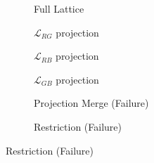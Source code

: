 \documentclass{article}
\begin{document}
\begin{figure}[hbtp]
    \centering
    \begin{subfigure}[b]{0.32\textwidth}
        \centering
        \resizebox{\linewidth}{!}{
            
        }
        \caption{Full Lattice}
    \end{subfigure}
    \hfill
    \begin{subfigure}[b]{0.32\textwidth}
        \centering
        \resizebox{\linewidth}{!}{
            
        }
        \caption{$\mathcal{L}_{RG}$ projection}
    \end{subfigure}
    \hfill
    \begin{subfigure}[b]{0.32\textwidth}
        \centering
        \resizebox{\linewidth}{!}{
            
        }
        \caption{$\mathcal{L}_{RB}$ projection}
    \end{subfigure}

    \vspace{0.5cm}

    \begin{subfigure}[b]{0.32\textwidth}
        \centering
        \resizebox{\linewidth}{!}{
            
        }
        \caption{$\mathcal{L}_{GB}$ projection}
    \end{subfigure}
    \hfill
    \begin{subfigure}[b]{0.32\textwidth}
        \centering
        \resizebox{\linewidth}{!}{
            
        }
        \caption{Projection Merge (Failure)}
    \end{subfigure}
    \hfill
    \begin{subfigure}[b]{0.32\textwidth}
        \centering
        \resizebox{\linewidth}{!}{
            
        }
        \caption{Restriction (Failure)}
    \end{subfigure}
\end{figure}
\end{document}
